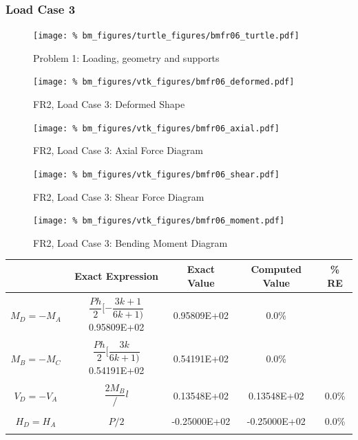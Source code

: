 \subsubsection{Load Case 3}
\begin{figure}[h]
    \texttt{[image: \%
                            bm\_figures/turtle\_figures/bmfr06\_turtle.pdf]}
    \centering
    \caption{Problem 1: Loading, geometry and supports}
    \label{fig:bmfr06_turtle}
\end{figure}


\begin{figure}[!htb]
    \texttt{[image: \%
                     bm\_figures/vtk\_figures/bmfr06\_deformed.pdf]}
    \centering
    \caption{FR2, Load Case 3: Deformed Shape}
    \label{fig:bmfr06_deformed}
\end{figure}
\begin{figure}[!htb]
    \texttt{[image: \%
                     bm\_figures/vtk\_figures/bmfr06\_axial.pdf]}
    \centering
    \caption{FR2, Load Case 3: Axial Force Diagram}
    \label{fig:bmfr06_shear}
\end{figure}
\begin{figure}[!htb]
    \texttt{[image: \%
                     bm\_figures/vtk\_figures/bmfr06\_shear.pdf]}
    \centering
    \caption{FR2, Load Case 3: Shear Force Diagram}
    \label{fig:bmfr06_shear}
\end{figure}
\begin{figure}[!htb]
    \texttt{[image: \%
                     bm\_figures/vtk\_figures/bmfr06\_moment.pdf]}
    \centering
    \caption{FR2, Load Case 3: Bending Moment Diagram}
    \label{fig:bmfr06_moment}
\end{figure}
\begin{table}[h!]
\centering
\begin{tabular}{ c| c c c c }
    & Exact Expression & Exact Value & Computed Value & \% RE \\ \hline \\
    $M_D=-M_A$  & $\dfrac{Ph}{2}[-\dfrac{3k+1}{6k+1)}$ 0.95809E+02 & 0.95809E+02 & 0.0\% \\ \\
    $M_B=-M_C$  & $\dfrac{Ph}{2}[\dfrac{3k}{6k+1)}$ 0.54191E+02 & 0.54191E+02 & 0.0\% \\ \\
    $V_D=-V_A$  & $\dfrac{2M_B}/{l}$ & 0.13548E+02 & 0.13548E+02 & 0.0\% \\ \\
    $H_D=H_A$   & ${P}/{2}$ & -0.25000E+02 & -0.25000E+02 & 0.0\% \\ \\
\end{tabular}
\end{table}

